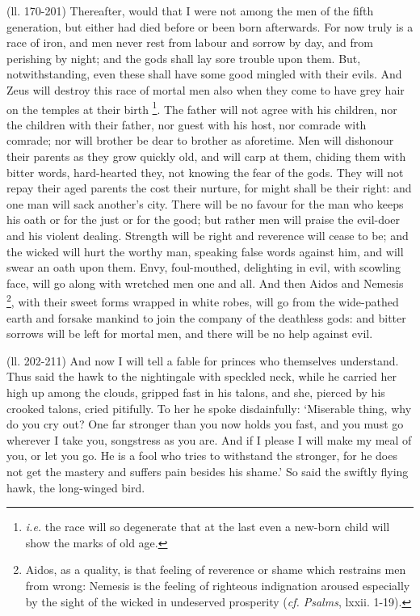 (ll. 170-201) Thereafter, would that I were not among the men of the fifth
generation, but either had died before or been born afterwards. For now truly
is a race of iron, and men never rest from labour and sorrow by day, and from
perishing by night; and the gods shall lay sore trouble upon them. But,
notwithstanding, even these shall have some good mingled with their evils. And
Zeus will destroy this race of mortal men also when they come to have grey hair
on the temples at their birth \footnote{\emph{i.e.} the race will
so degenerate that at the last even a new-born child will show the marks of old
age.}. The father will not agree with
his children, nor the children with their father, nor guest with his host, nor
comrade with comrade; nor will brother be dear to brother as aforetime. Men
will dishonour their parents as they grow quickly old, and will carp at them,
chiding them with bitter words, hard-hearted they, not knowing the fear of the
gods. They will not repay their aged parents the cost their nurture, for might
shall be their right: and one man will sack another’s city. There will be
no favour for the man who keeps his oath or for the just or for the good; but
rather men will praise the evil-doer and his violent dealing. Strength will be
right and reverence will cease to be; and the wicked will hurt the worthy man,
speaking false words against him, and will swear an oath upon them. Envy,
foul-mouthed, delighting in evil, with scowling face, will go along with
wretched men one and all. And then Aidos and Nemesis \footnote{Aidos, as a quality, is
that feeling of reverence or shame which restrains men from wrong: Nemesis is
the feeling of righteous indignation aroused especially by the sight of the
wicked in undeserved prosperity (\emph{cf. Psalms}, lxxii. 1-19).}, with
their sweet forms wrapped in white robes, will go from the wide-pathed earth
and forsake mankind to join the company of the deathless gods: and bitter
sorrows will be left for mortal men, and there will be no help against evil.

(ll. 202-211) And now I will tell a fable for princes who themselves
understand. Thus said the hawk to the nightingale with speckled neck, while he
carried her high up among the clouds, gripped fast in his talons, and she,
pierced by his crooked talons, cried pitifully. To her he spoke disdainfully:
‘Miserable thing, why do you cry out? One far stronger than you now holds
you fast, and you must go wherever I take you, songstress as you are. And if I
please I will make my meal of you, or let you go. He is a fool who tries to
withstand the stronger, for he does not get the mastery and suffers pain
besides his shame.’ So said the swiftly flying hawk, the long-winged
bird.

